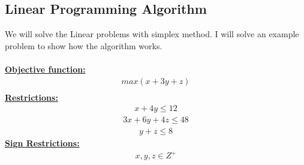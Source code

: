 \subsection{Linear Programming Algorithm}
We will solve the Linear problems with simplex method. I will solve an example problem to show how the algorithm works.\\
\\
\underline{\textbf{Objective function:}}\\
\begin{equation*}
\begin{split}
max(x+3y+z) \\
\end{split}
\end{equation*}
\underline{\textbf{Restrictions:}}\\
\begin{equation*}
\begin{split}
x+4y\leq 12
\end{split}
\end{equation*}
\begin{equation*}
\begin{split}
3x+6y+4z\leq 48
\end{split}
\end{equation*}
\begin{equation*}
\begin{split}
y+z\leq 8
\end{split}
\end{equation*}
\underline{\textbf{Sign Restrictions:}}\\
\begin{equation*}
\begin{split}
x,y,z\in Z^+
\end{split}
\end{equation*}
